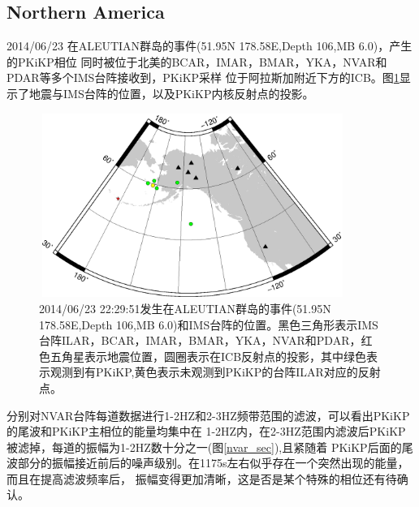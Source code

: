 \subsection{Northern America}

2014/06/23 在ALEUTIAN群岛的事件(51.95N 178.58E,Depth 106,MB 6.0)，产生的PKiKP相位
同时被位于北美的BCAR，IMAR，BMAR，YKA，NVAR和PDAR等多个IMS台阵接收到，PKiKP采样
位于阿拉斯加附近下方的ICB。图\ref{alas}显示了地震与IMS台阵的位置，以及PKiKP内核反射点的投影。

\begin{figure}[!ht]
	\centering
	\includegraphics[height=6cm,width=10cm]{fig/chap3/ALAS.eps}
	\caption{2014/06/23 22:29:51发生在ALEUTIAN群岛的事件(51.95N 178.58E,Depth 106,MB%
6.0)和IMS台阵的位置。黑色三角形表示IMS台阵ILAR，BCAR，IMAR，BMAR，YKA，NVAR和PDAR，红色五角星表示地震位置，圆圈表示在ICB反射点的投影，其中绿色表示观测到有PKiKP,黄色表示未观测到PKiKP的台阵ILAR对应的反射点。}
	\label{alas}
\end{figure}

分别对NVAR台阵每道数据进行1-2HZ和2-3HZ频带范围的滤波，可以看出PKiKP的尾波和PKiKP主相位的能量均集中在
1-2HZ内，在2-3HZ范围内滤波后PKiKP被滤掉，每道的振幅为1-2HZ数十分之一(图\ref{nvar_sec}),且紧随着
PKiKP后面的尾波部分的振幅接近前后的噪声级别。在1175s左右似乎存在一个突然出现的能量，而且在提高滤波频率后，
振幅变得更加清晰，这是否是某个特殊的相位还有待确认。


